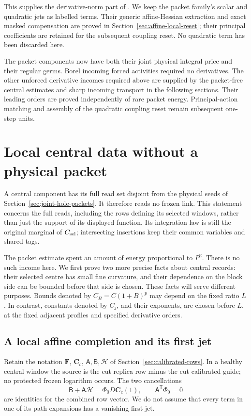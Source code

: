 \documentclass[11pt,reqno]{amsart}
\numberwithin{equation}{section}
\theoremstyle{definition}
\theoremstyle{remark}
\begin{document}
This supplies the derivative-norm part of
\cite[Corollary~31.4, p.~194]{Main}. We keep the packet
family's scalar and quadratic jets as labelled terms.
Their generic affine-Hessian extraction and exact masked
compensation are proved in Section~\ref{sec:affine-local-reset};
their principal coefficients are retained for the subsequent
coupling reset. No quadratic term has been discarded here.

The packet components now have both their joint physical
integral price and their regular germs. Borel incoming forced
activities required no derivatives. The other unforced derivative incomes required above are
supplied by the packet-free central estimates and sharp incoming
transport in the following sections. Their leading orders are
proved independently of rare packet energy. Principal-action
matching and assembly of the quadratic coupling reset remain
subsequent one-step units.


\section{Local central data without a physical packet}
\label{sec:central-local-data}

A central component has its full read set disjoint from the
physical seeds of Section~\ref{sec:joint-hole-packets}. It
therefore reads no frozen link. This statement concerns the full
reads, including the rows defining its selected windows, rather
than just the support of its displayed function. Its integration
law is still the original marginal of \(C_{\rm sel}\); intersecting
insertions keep their common variables and shared tags.

The packet estimate spent an amount of energy proportional to
\(P^2\). There is no such income here. We first prove two more
precise facts about central records: their selected centre has
small fine curvature, and their dependence on the block side can
be bounded before that side is chosen. These facts will serve
different purposes. Bounds denoted by \(C_B=C(1+B)^p\) may depend
on the fixed ratio \(L\). In contrast, constants denoted by
\(C_j\), and their exponents, are chosen before \(L\), at the
fixed adjacent profiles and specified derivative orders.

\subsection{A local affine completion and its first jet}

Retain the notation \(\mathbf F\), \(\mathbf C_c\),
\(\mathsf A,\mathsf B,\mathcal H\) of
Section~\ref{sec:calibrated-rows}. In a healthy central window
the source is the cut replica row minus the cut calibrated guide;
no protected frozen logarithm occurs. The two cancellations
\begin{equation}
 \mathsf B+\mathsf A\mathcal H
       =\Phi_0D\mathbf C_c(1),\qquad \mathsf A^{\mathsf T}\Phi_0=0
 \label{eq:central-local-flat-cancellation}
\end{equation}
are identities for the combined row vector. We do not assume
that every term in one of its path expansions has a vanishing
first jet.
\end{document}
